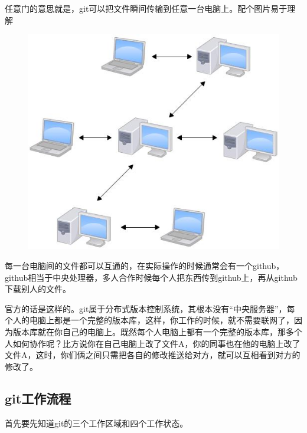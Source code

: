 \documentclass[12pt,a4paper]{article}
\begin{document}
	    任意门的意思就是，git可以把文件瞬间传输到任意一台电脑上。配个图片易于理解
\begin{figure}[H]
	\centering
    \includegraphics[scale=1]{figures/0.jpg} 	
	\caption{}
	\label{fig:0}
\end{figure}
        每一台电脑间的文件都可以互通的，在实际操作的时候通常会有一个github，github相当于中央处理器，多人合作时候每个人把东西传到github上，再从github下载别人的文件。
        
        官方的话是这样的。git属于分布式版本控制系统，其根本没有“中央服务器”，每个人的电脑上都是一个完整的版本库，这样，你工作的时候，就不需要联网了，因为版本库就在你自己的电脑上。既然每个人电脑上都有一个完整的版本库，那多个人如何协作呢？比方说你在自己电脑上改了文件A，你的同事也在他的电脑上改了文件A，这时，你们俩之间只需把各自的修改推送给对方，就可以互相看到对方的修改了。
        
        \subsection{git工作流程}
        首先要先知道git的三个工作区域和四个工作状态。
        
\end{document}
